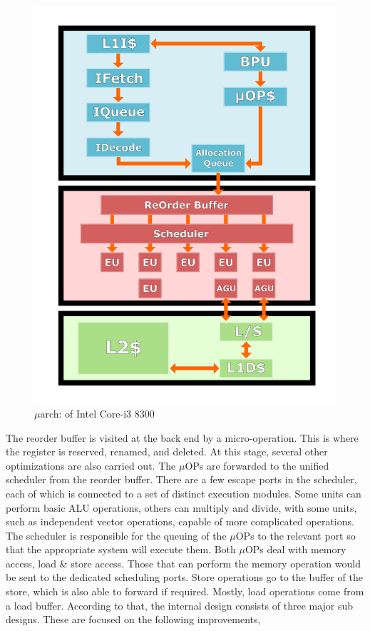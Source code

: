 \documentclass[a4paper,11pt]{article}
\begin{document}
\begin{figure}
	\includegraphics[scale= 0.05]{figures/intuarch}
	\caption{$\mu$arch: of Intel Core-i3 8300}
\end{figure}
The reorder buffer is visited at the back end by a micro-operation. This is where the register is reserved, renamed, and deleted. At this stage, several other optimizations are also carried out. The $\mu$OPs are forwarded to the unified scheduler from the reorder buffer. There are a few escape ports in the scheduler, each of which is connected to a set of distinct execution modules. Some units can perform basic ALU operations, others can multiply and divide, with some units, such as independent vector operations, capable of more complicated operations. The scheduler is responsible for the queuing of the $\mu$OPs to the relevant port so that the appropriate system will execute them.
Both $\mu$OPs deal with memory access, load \& store access. Those that can perform the memory operation would be sent to the dedicated scheduling ports. Store operations go to the buffer of the store, which is also able to forward if required. Mostly, load operations come from a load buffer.  According to that, the internal design consists of three major sub designs. These are focused on the following improvements,
\end{document}
